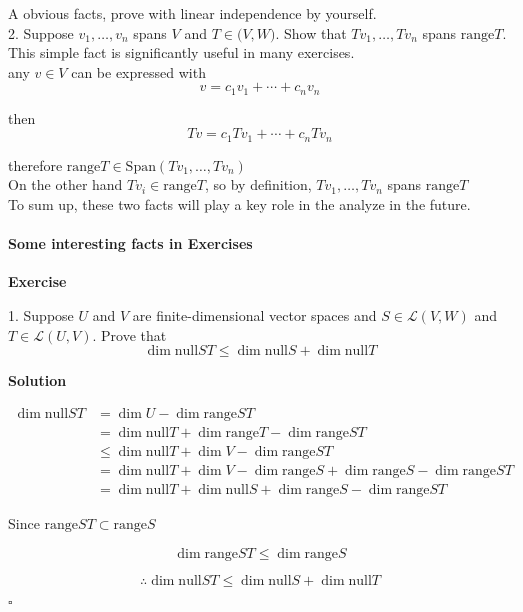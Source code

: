 \documentclass{article}
\newenvironment{exercise}{%
{\textbf{Exercise\\}
    }
}{
}
\newenvironment{solution}{%
{
    \textbf{Solution\\}
    }
}{
  \hfill $\square$ 
  \par\bigskip 
}
\newcommand{\spans}{\text{Span}}
\newcommand{\range}{\text{range}}
\newcommand{\n}{\text{null}}
\begin{document}
\begin{CJK}{UTF8}{gkai}
A obvious facts, prove with linear independence by yourself.\\

2. Suppose $v_1,\ldots,v_n$ spans $V$ and $T \in \mathcal(V,W)$. Show that $Tv_1,\ldots,Tv_n$ spans $\text{range} T$.\\

This simple fact is significantly useful in many exercises.\\

any $v \in V$ can be expressed with 
\[v = c_1 v_1 + \cdots + c_n v_n\]

then
\[Tv = c_1 Tv_1 + \cdots + c_n T v_n\]

therefore $\text{range} T \in \spans(Tv_1,\ldots, Tv_n)$\\

On the other hand $Tv_i \in \text{range} T$, so by definition, $Tv_1,\ldots , T v_n$ spans $\text{range} T$\\

To sum up, these two facts will play a key role in the analyze in the future.\\

\paragraph{Some interesting facts in Exercises\\}

\begin{exercise}
1. Suppose $U$ and $V$ are finite-dimensional vector spaces and $S \in  \mathcal{L}(V ,W)$ and $T \in\mathcal{L}(U,V)$. Prove that
\[\dim \n S T \leq \dim \n S +\dim \n T\]
\end{exercise}

\begin{solution}
\[
\begin{aligned}
\dim \n ST &= \dim U - \dim \range ST\\
&= \dim \n T + \dim  \range T - \dim \range ST\\
&\leq \dim \n T + \dim V - \dim \range ST\\
&= \dim \n T + \dim V - \dim \range S + \dim \range S - \dim \range ST\\
&= \dim \n T + \dim \n S + \dim \range S - \dim \range ST
\end{aligned}
\]

Since $\range  ST \subset \range  S$

\[\dim \range  ST \leq \dim \range  S\]

\[\therefore \dim \n S T \leq \dim \n S +\dim \n T\]
\end{solution}


\end{CJK}
\end{document}
